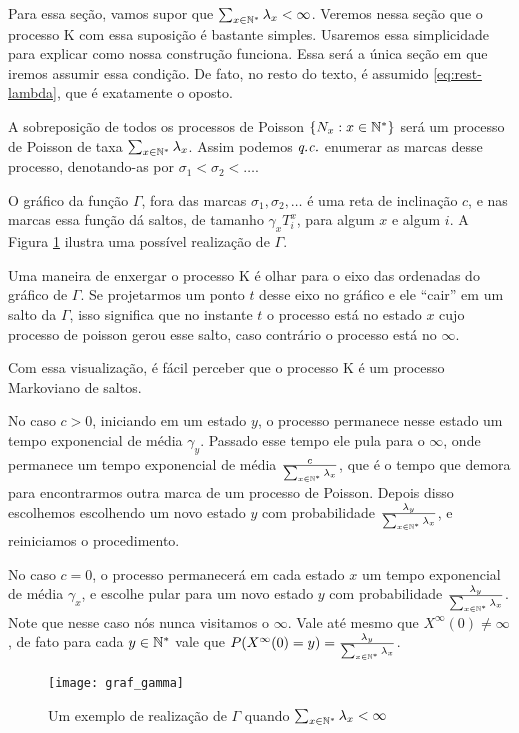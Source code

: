 Para essa seção, vamos supor que $\sum_{x \in {\mathbb{N^*}}} \lambda_x <
\infty$. Veremos nessa seção que o processo K com essa suposição é
bastante simples. Usaremos essa simplicidade para explicar como nossa
construção funciona. Essa será a única seção em que iremos assumir
essa condição. De fato, no resto do texto, é assumido
\eqref{eq:rest-lambda}, que é exatamente o oposto.

A sobreposição de todos os processos de Poisson $\{N_x : x \in {\mathbb{N^*}}\}$
será um processo de Poisson de taxa $\sum_{x \in {\mathbb{N^*}}}
\lambda_x$. Assim podemos ${\emph{q.c.}}$ enumerar as marcas desse processo,
denotando-as por $ \sigma_1 < \sigma_2 < \ldots$.

O gráfico da função $\Gamma$, fora das marcas $\sigma_1, \sigma_2,
\ldots$ é uma reta de inclinação $c$, e nas marcas essa função dá
saltos, de tamanho $\gamma_x T^x_i$, para algum $x$ e algum $i$. A
Figura \ref{fig:graf_gamma} ilustra uma possível realização de
$\Gamma$.

Uma maneira de enxergar o processo K é olhar para o eixo das ordenadas
do gráfico de $\Gamma$. Se projetarmos um ponto $t$ desse eixo no
gráfico e ele ``cair'' em um salto da $\Gamma$, isso significa que no
instante $t$ o processo está no estado $x$ cujo processo de poisson
gerou esse salto, caso contrário o processo está no $\infty$.

Com essa visualização, é fácil perceber que o processo K é um processo
Markoviano de saltos.

No caso $c > 0$, iniciando em um estado $y$, o processo permanece
nesse estado um tempo exponencial de média $\gamma_y$. Passado esse
tempo ele pula para o $\infty$, onde permanece um tempo exponencial de
média $\frac{c}{\sum_{x \in {\mathbb{N^*}}} \lambda_x}$, que é o tempo que demora
para encontrarmos outra marca de um processo de Poisson. Depois disso
escolhemos escolhendo um novo estado $y$ com probabilidade
$\frac{\lambda_y}{\sum_{x \in {\mathbb{N^*}}} \lambda_x}$, e reiniciamos o procedimento.

No caso $c=0$, o processo permanecerá em cada estado $x$ um tempo
exponencial de média $\gamma_x$, e escolhe pular para um novo estado
$y$ com probabilidade $\frac{\lambda_y}{\sum_{x \in {\mathbb{N^*}}} \lambda_x}$.
Note que nesse caso nós nunca visitamos o $\infty$. Vale até mesmo que
$X^\infty(0) \neq \infty$ \qc, de fato para cada $y \in {\mathbb{N^*}}$ vale que 
$P(X^\infty(0) = y) = \frac{\lambda_y}{\sum_{x \in {\mathbb{N^*}}} \lambda_x}$.

\begin{figure}
  \centering
  \texttt{[image: graf\_gamma]}
  \caption{Um exemplo de realização de $\Gamma$ quando $\sum_{x \in
      {\mathbb{N^*}}} \lambda_x < \infty$}
  \label{fig:graf_gamma}
\end{figure}

